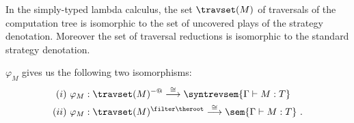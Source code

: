 In the simply-typed lambda calculus, the set $\travset(M)$ of
traversals of the computation tree is isomorphic to the set of
uncovered plays of the strategy denotation. Moreover the set of
traversal reductions is isomorphic to the standard strategy
denotation.

\begin{theorem}
\label{thm:correspondence} $\varphi_M$ gives us the following two
isomorphisms:
\begin{eqnarray*}
(i)~\varphi_M  &: \travset(M)^{-@} \stackrel{\cong}{\longrightarrow} \syntrevsem{\Gamma \vdash M :T} \\
(ii)~\varphi_M  &: \travset(M )^{\filter \theroot} \stackrel{\cong}{\longrightarrow} \sem{\Gamma \vdash M : T} \ .
\end{eqnarray*}
\end{theorem}

